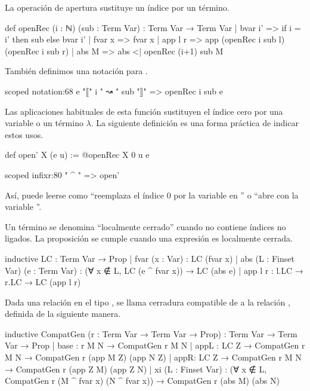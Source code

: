 \begin{defn}
La operación de apertura sustituye un índice por un término. 
\begin{leancode}
def openRec (i : ℕ) (sub : Term Var) : Term Var → Term Var
  | bvar i' => if i = i' then sub else bvar i'
  | fvar x  => fvar x
  | app l r => app (openRec i sub l) (openRec i sub r)
  | abs M   => abs <| openRec (i+1) sub M
\end{leancode}
También definimos una notación para .
\begin{leancode}
scoped notation:68 e "⟦" i " ↝ " sub "⟧" => openRec i sub e
\end{leancode}
Las aplicaciones habituales de esta función sustituyen el índice 
cero por una variable o un término $\lambda$. La siguiente definición 
es una forma práctica de indicar estos usos.
\begin{leancode}
def open' {X} (e u) := @openRec X 0 u e  
 
scoped infixr:80 " ^ " => open'
\end{leancode}
Así,  puede leerse como 
``reemplaza el índice $0$ por la variable  en ''
o ``abre  con la variable ''. 
\end{defn}

\begin{defn}
Un término se denomina ``localmente cerrado''
cuando no contiene índices no ligados.
La proposición  se cumple cuando una expresión  
es localmente cerrada.
\begin{leancode}
inductive LC : Term Var → Prop
  | fvar (x : Var)  : LC (fvar x)
  | abs (L : Finset Var) (e : Term Var) : (∀ x ∉ L, LC (e ^ fvar x)) → LC (abs e)
  | app {l r} : l.LC → r.LC → LC (app l r)
\end{leancode}
\end{defn}

\begin{defn}
Dada una relación  en el tipo ,
se llama cerradura compatible de  a la relación ,
definida de la siguiente manera.
\begin{leancode}
inductive CompatGen (r : Term Var → Term Var → Prop) : Term Var → Term Var → Prop
  | base : r M N → CompatGen r M N
  | appL : LC Z → CompatGen r M N → CompatGen r (app M Z) (app N Z)
  | appR: LC Z → CompatGen r M N → CompatGen r (app Z M) (app Z N)
  | xi (L : Finset Var) : (∀ x ∉ L, CompatGen r (M ^ fvar x) (N ^ fvar x)) →
    CompatGen r (abs M) (abs N)
\end{leancode}
\end{defn}

